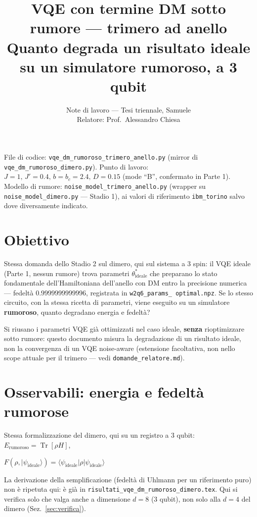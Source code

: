 \documentclass[11pt,a4paper]{article}
\title{\vspace{-1.5em}\color{inkblue}VQE con termine DM sotto rumore --- trimero ad anello\\[0.2em]
\Large\normalfont\color{softgray}Quanto degrada un risultato ideale su un simulatore rumoroso, a 3 qubit}
\author{Note di lavoro --- Tesi triennale, Samuele\\ Relatore: Prof.\ Alessandro Chiesa}
\date{}
\newcommand{\Tr}{\operatorname{Tr}}
\newcommand{\ket}[1]{\lvert #1 \rangle}
\newcommand{\bra}[1]{\langle #1 \rvert}
\begin{document}
\sloppy
\maketitle
\thispagestyle{fancy}
\vspace{-2.0em}

File di codice: \texttt{vqe\_dm\_\allowbreak rumoroso\_trimero\_anello.py}
(mirror di \texttt{vqe\_dm\_rumoroso\_dimero.py}). Punto di lavoro:
$J=1,\,J'=0.4,\,b=b_c=2.4,\,D=0.15$ (mode ``B'', confermato in Parte 1).
Modello di rumore: \texttt{noise\_model\_trimero\_anello.py} (wrapper su
\texttt{noise\_model\_dimero.py} --- Stadio 1), ai valori di riferimento
\texttt{ibm\_torino} salvo dove diversamente indicato.

\tableofcontents

\section{Obiettivo}

Stessa domanda dello Stadio 2 sul dimero, qui sul sistema a 3 spin: il
VQE ideale (Parte 1, nessun rumore) trova parametri
$\theta^*_\text{ideale}$ che preparano lo stato fondamentale
dell'Hamiltoniana dell'anello con DM entro la precisione numerica ---
fedeltà $0.9999999999996$, registrata in \texttt{w2q6\_params\_
optimal.npz}. Se lo stesso circuito, con la stessa ricetta di parametri,
viene eseguito su un simulatore \textbf{rumoroso}, quanto degradano
energia e fedeltà?

\begin{keyeq}[title={Scelta di modellazione dichiarata, identica al dimero}]
\centering
Si riusano i parametri VQE già ottimizzati nel caso ideale, \textbf{senza}
rioptimizzare sotto rumore: questo documento misura la degradazione di un
risultato ideale, non la convergenza di un VQE noise-aware (estensione
facoltativa, non nello scope attuale per il trimero --- vedi
\texttt{domande\_relatore.md}).
\end{keyeq}

\section{Osservabili: energia e fedeltà rumorose}

Stessa formalizzazione del dimero, qui su un registro a 3 qubit:
$E_\text{rumoroso}=\Tr[\rho H]$,
\begin{keyeq}
\centering
$F(\rho,\ket{\psi_\text{ideale}}) = \bra{\psi_\text{ideale}}\rho\ket{\psi_\text{ideale}}$
\end{keyeq}
La derivazione della semplificazione (fedeltà di Uhlmann per un
riferimento puro) non è ripetuta qui: è già in
\texttt{risultati\_vqe\_dm\_\allowbreak rumoroso\_dimero.tex}. Qui si
verifica solo che valga anche a dimensione $d=8$ (3 qubit), non solo alla
$d=4$ del dimero (Sez.~\ref{sec:verifica}).
\end{document}
